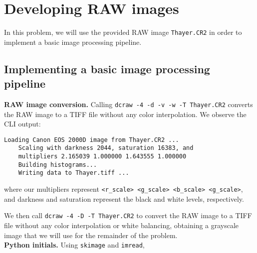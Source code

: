 \section{Developing RAW images}
In this problem, we will use the provided RAW image \texttt{Thayer.CR2} 
in order to implement a basic image processing pipeline.

\subsection{Implementing a basic image processing pipeline}


\textbf{RAW image conversion.}
Calling \texttt{dcraw -4 -d -v -w -T Thayer.CR2} 
converts the RAW image to a TIFF file without any color interpolation. 
We observe the CLI output:
\begin{Verbatim}[fontsize=\small]
    Loading Canon EOS 2000D image from Thayer.CR2 ...
    Scaling with darkness 2044, saturation 16383, and
    multipliers 2.165039 1.000000 1.643555 1.000000
    Building histograms...
    Writing data to Thayer.tiff ...
\end{Verbatim}
where our multipliers represent \texttt{<r\_scale> <g\_scale> <b\_scale> <g\_scale>},
and darkness and saturation represent the black and white levels, respectively.

We then call \texttt{dcraw -4 -D -T Thayer.CR2} to convert the RAW image to a TIFF file 
without any color interpolation or white balancing, obtaining a grayscale image that  
we will use for the remainder of the problem.\\


\noindent\textbf{Python initials.}
Using \texttt{skimage} and \texttt{imread},